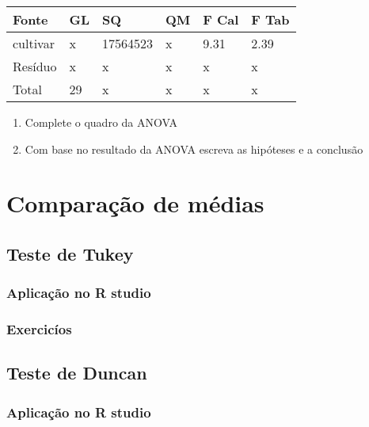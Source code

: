 \documentclass[
]{book}
\begin{document}
\begin{longtable}[]{@{}llllll@{}}
\toprule()
Fonte & GL & SQ & QM & F Cal & F Tab \\
\midrule()
\endhead
cultivar & x & 17564523 & x & 9.31 & 2.39 \\
Resíduo & x & x & x & x & x \\
Total & 29 & x & x & x & x \\
\bottomrule()
\end{longtable}

\begin{enumerate}
\def\labelenumi{\alph{enumi})}
\item
  Complete o quadro da ANOVA
\item
  Com base no resultado da ANOVA escreva as hipóteses e a conclusão
\end{enumerate}

\hypertarget{comparauxe7uxe3o-de-muxe9dias}{%
\chapter{Comparação de médias}\label{comparauxe7uxe3o-de-muxe9dias}}

\hypertarget{teste-de-tukey}{%
\section{Teste de Tukey}\label{teste-de-tukey}}

\hypertarget{aplicauxe7uxe3o-no-r-studio-3}{%
\subsection{Aplicação no R studio}\label{aplicauxe7uxe3o-no-r-studio-3}}

\hypertarget{exercicuxedos-3}{%
\subsection{Exercicíos}\label{exercicuxedos-3}}

\hypertarget{teste-de-duncan}{%
\section{Teste de Duncan}\label{teste-de-duncan}}

\hypertarget{aplicauxe7uxe3o-no-r-studio-4}{%
\subsection{Aplicação no R studio}\label{aplicauxe7uxe3o-no-r-studio-4}}
\end{document}
